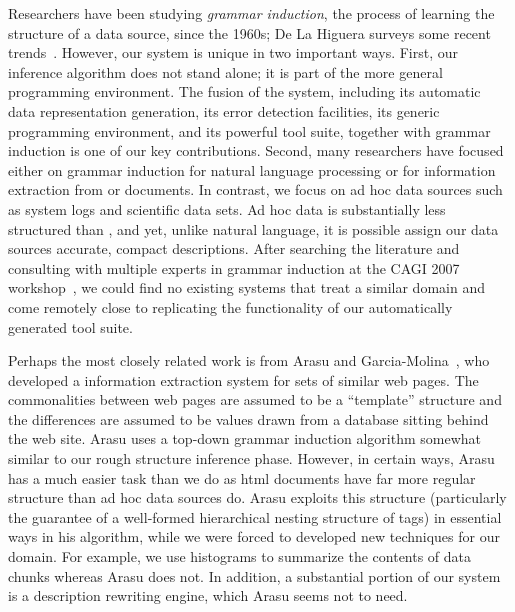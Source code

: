 Researchers have been studying {\em grammar induction}, the process of
learning the structure of a data source, since the 1960s; De La Higuera
surveys some recent trends~\cite{higuera01current}.  However,
our system is unique in two important ways.  First, our inference
algorithm does not stand alone; it is part of the more general \pads{}
programming environment.  The fusion of the
\pads{} system, including its automatic data representation generation,
its error detection facilities, its generic programming environment, 
and its powerful tool suite, together with grammar induction
is one of our key contributions.  Second, many researchers have
focused either on grammar induction for natural language processing or
for information extraction from \xml{} or \html{} documents.  In
contrast, we focus on ad hoc data sources such as system logs and
scientific data sets. Ad hoc data is substantially less
structured than \xml{}, and yet, unlike natural language, it is
possible assign our data sources accurate, compact descriptions.  After 
searching the literature and consulting
with multiple experts in grammar induction at the CAGI 2007 
workshop~\cite{cagi07}, we could find no existing 
systems that treat a similar domain and come remotely close to
replicating the functionality of our automatically generated tool suite.


Perhaps the most closely related work is from Arasu and 
Garcia-Molina~\cite{arasu+:sigmod03}, who developed a information
extraction system for sets of similar web pages.  The
commonalities between web pages are assumed to be a ``template'' structure
and the differences are assumed to be values drawn from a database
sitting behind the web site.  Arasu uses a top-down grammar induction
algorithm somewhat similar to our rough structure inference phase.  
However, in certain ways, Arasu has a much easier task than we do as html
documents have far more regular structure than ad hoc data sources do.
Arasu exploits this structure (particularly the guarantee of a well-formed
hierarchical nesting structure of \xml{} tags) in essential ways in his 
algorithm,
while we were forced to developed new techniques for our domain.  For example,
we use histograms to summarize the contents of data chunks whereas
Arasu does not.  In addition, a substantial portion of our system
is a description rewriting engine, which Arasu seems not to need.  

